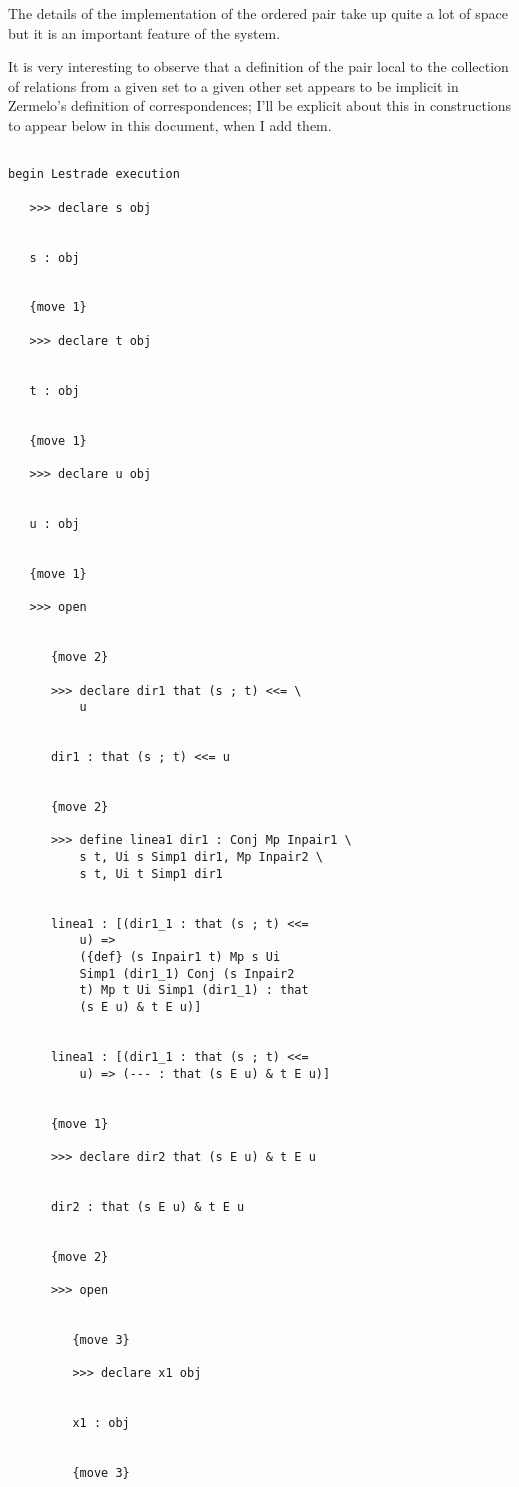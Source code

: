 \documentclass[12pt]{article}
\begin{document}
The details of the implementation of the ordered pair take up quite a lot of space but it is an important feature of the system.

It is very interesting to observe that a definition of the pair local to the collection of relations from a given set to a given other set appears to be implicit in Zermelo's definition of correspondences;  I'll be explicit about this in constructions to appear below in this document, when I add them.

\begin{verbatim}

begin Lestrade execution

   >>> declare s obj


   s : obj


   {move 1}

   >>> declare t obj


   t : obj


   {move 1}

   >>> declare u obj


   u : obj


   {move 1}

   >>> open


      {move 2}

      >>> declare dir1 that (s ; t) <<= \
          u


      dir1 : that (s ; t) <<= u


      {move 2}

      >>> define linea1 dir1 : Conj Mp Inpair1 \
          s t, Ui s Simp1 dir1, Mp Inpair2 \
          s t, Ui t Simp1 dir1


      linea1 : [(dir1_1 : that (s ; t) <<= 
          u) => 
          ({def} (s Inpair1 t) Mp s Ui 
          Simp1 (dir1_1) Conj (s Inpair2 
          t) Mp t Ui Simp1 (dir1_1) : that 
          (s E u) & t E u)]


      linea1 : [(dir1_1 : that (s ; t) <<= 
          u) => (--- : that (s E u) & t E u)]


      {move 1}

      >>> declare dir2 that (s E u) & t E u


      dir2 : that (s E u) & t E u


      {move 2}

      >>> open


         {move 3}

         >>> declare x1 obj


         x1 : obj


         {move 3}


\end{verbatim}
\end{document}
